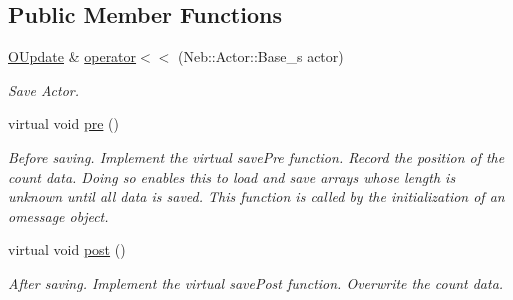 \subsection*{\-Public \-Member \-Functions}
\begin{DoxyCompactItemize}
\item 
\hypertarget{structNeb_1_1Message_1_1Actor_1_1OUpdate_a4a04c15c17b062b23cd4c7fd52913960}{\hyperlink{structNeb_1_1Message_1_1Actor_1_1OUpdate}{\-O\-Update} \& \hyperlink{structNeb_1_1Message_1_1Actor_1_1OUpdate_a4a04c15c17b062b23cd4c7fd52913960}{operator$<$$<$} (\-Neb\-::\-Actor\-::\-Base\-\_\-s actor)}\label{structNeb_1_1Message_1_1Actor_1_1OUpdate_a4a04c15c17b062b23cd4c7fd52913960}

\begin{DoxyCompactList}\small\item\em \-Save \-Actor. \end{DoxyCompactList}\item 
\hypertarget{structNeb_1_1Message_1_1Actor_1_1OUpdate_ad7b4c3680889ed31f6bcc2db453f61e3}{virtual void \hyperlink{structNeb_1_1Message_1_1Actor_1_1OUpdate_ad7b4c3680889ed31f6bcc2db453f61e3}{pre} ()}\label{structNeb_1_1Message_1_1Actor_1_1OUpdate_ad7b4c3680889ed31f6bcc2db453f61e3}

\begin{DoxyCompactList}\small\item\em \-Before saving. \-Implement the virtual save\-Pre function. \-Record the position of the count data. \-Doing so enables {\ttfamily this} to load and save arrays whose length is unknown until all data is saved. \-This function is called by the initialization of an omessage object. \end{DoxyCompactList}\item 
virtual void \hyperlink{structNeb_1_1Message_1_1Actor_1_1OUpdate_aa972a33a8c8220e7f6194e44c019d817}{post} ()
\begin{DoxyCompactList}\small\item\em \-After saving. \-Implement the virtual save\-Post function. \-Overwrite the count data. \end{DoxyCompactList}\end{DoxyCompactItemize}


